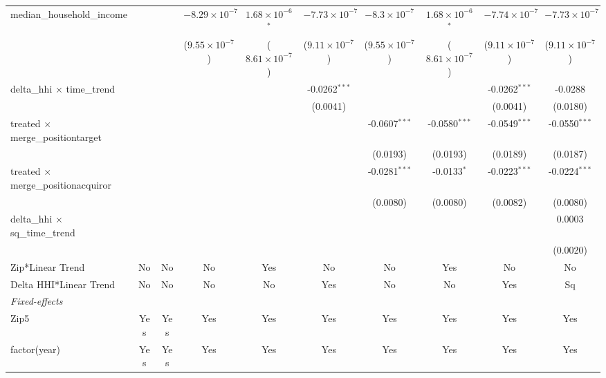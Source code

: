 \begin{table}[H]
{\begin{tabular}{lccccccccc}
 median\_household\_income&   &    & $-8.29\times 10^{-7}$ & $1.68\times 10^{-6}$$^{*}$ & $-7.73\times 10^{-7}$ & $-8.3\times 10^{-7}$ & $1.68\times 10^{-6}$$^{*}$ & $-7.74\times 10^{-7}$ & $-7.73\times 10^{-7}$\\ 

   &   &    & ($9.55\times 10^{-7}$) & ($8.61\times 10^{-7}$) & ($9.11\times 10^{-7}$) & ($9.55\times 10^{-7}$) & ($8.61\times 10^{-7}$) & ($9.11\times 10^{-7}$) & ($9.11\times 10^{-7}$)\\ 

 delta\_hhi $\times $ time\_trend&   &    &    &    & -0.0262$^{***}$ &    &    & -0.0262$^{***}$ & -0.0288\\ 

   &   &    &    &    & (0.0041) &    &    & (0.0041) & (0.0180)\\ 

 treated $\times $ merge\_positiontarget&   &    &    &    &    & -0.0607$^{***}$ & -0.0580$^{***}$ & -0.0549$^{***}$ & -0.0550$^{***}$\\ 

   &   &    &    &    &    & (0.0193) & (0.0193) & (0.0189) & (0.0187)\\ 

 treated $\times $ merge\_positionacquiror&   &    &    &    &    & -0.0281$^{***}$ & -0.0133$^{*}$ & -0.0223$^{***}$ & -0.0224$^{***}$\\ 

   &   &    &    &    &    & (0.0080) & (0.0080) & (0.0082) & (0.0080)\\ 

 delta\_hhi $\times $ sq\_time\_trend&   &    &    &    &    &    &    &    & 0.0003\\ 

   &   &    &    &    &    &    &    &    & (0.0020)\\ 

 Zip*Linear Trend & No & No & No & Yes & No & No & Yes & No & No\\ 

 Delta HHI*Linear Trend & No & No & No & No & Yes & No & No & Yes & Sq\\ 

 \midrule \emph{Fixed-effects}&   &   &   &   &   &   &   &   &  \\ 

 Zip5 & Yes & Yes & Yes & Yes & Yes & Yes & Yes & Yes & Yes\\ 

 factor(year) & Yes & Yes & Yes & Yes & Yes & Yes & Yes & Yes & Yes\\ 


\end{tabular}}
\end{table}
